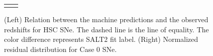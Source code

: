 \documentclass[proof]{pasj01}
\begin{document}
\begin{figure}[htbp]
\begin{tabular}{cc}
\begin{minipage}{0.5\hsize}
\begin{center}
            \end{center}
        \end{minipage}
    \end{tabular}  \caption{%
    (Left) Relation between the machine predictions and the observed redshifts for HSC SNe.
    The dashed line is the line of equality.
    The color difference represents SALT2 fit label.
    (Right) Normalized residual distribution for Case 0 SNe.
    }%
    \label{fig:redshift_estimation}
\end{figure}

%


%
\end{document}
